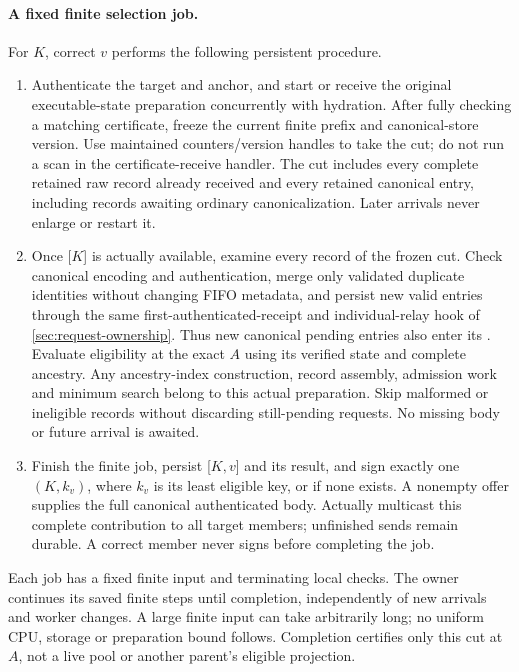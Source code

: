 \paragraph{A fixed finite selection job.}
For $K$, correct $v$ performs the following persistent procedure.
\begin{enumerate}[label=(\roman*),itemsep=2pt]
\item Authenticate the target and anchor, and start or receive the
original executable-state preparation concurrently with hydration.
After fully checking a matching  certificate, freeze the
current finite  prefix and canonical-store version.
Use maintained counters/version handles to take the cut; do not run a
scan in the certificate-receive handler. The cut includes every complete
retained raw record already received and every retained canonical entry,
including records awaiting ordinary canonicalization. Later arrivals
never enlarge or restart it.
\item Once [$K$] is actually available, examine every
record of the frozen cut. Check canonical encoding and authentication,
merge only validated duplicate identities without changing FIFO metadata,
and persist new valid entries through the same first-authenticated-receipt
and individual-relay hook of \cref{sec:request-ownership}. Thus new
canonical pending entries also enter its .
Evaluate eligibility at the exact $A$ using
its verified state and complete ancestry. Any ancestry-index construction,
record assembly, admission work and minimum search belong to this actual
preparation. Skip malformed or ineligible records without discarding
still-pending requests. No missing body or future arrival is awaited.
\item Finish the finite job, persist [$K,v$] and its
result, and sign exactly one
$(K,k_v)$, where $k_v$ is its least eligible key,
or  if none exists. A nonempty offer supplies the full
canonical authenticated body. Actually multicast this complete
contribution to all target members; unfinished sends remain durable.
A correct member never signs before completing the job.
\end{enumerate}
Each job has a fixed finite input and terminating local checks. The
owner continues its saved finite steps until completion, independently
of new arrivals and worker changes. A large finite input can take
arbitrarily long; no uniform CPU, storage or preparation bound follows.
Completion certifies only this cut at $A$, not a live pool or another
parent's eligible projection.


